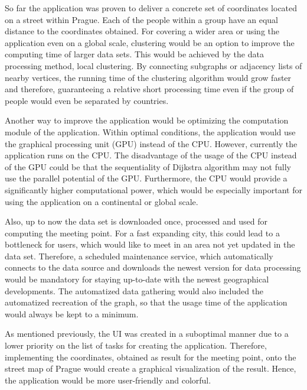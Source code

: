 \documentclass[thesis=M,english]{FITthesis}[2012/10/20]
\begin{document}
So far the application was proven to deliver a concrete set of coordinates located on a street within Prague. Each of the people within a group have an equal distance to the coordinates obtained. 
For covering a wider area or using the application even on a global scale, clustering would be an option to improve the computing time of larger data sets. This would be achieved by the data processing method, local clustering. By connecting subgraphs or adjacency lists of nearby vertices, the running time of the clustering algorithm would grow faster and therefore, guaranteeing a relative short processing time even if the group of people would even be separated by countries.


Another way to improve the application would be optimizing the computation module of the application. Within optimal conditions, the application would use the graphical processing unit (GPU) instead of the CPU. However, currently the application runs on the CPU. The disadvantage of the usage of the CPU instead of the GPU could be that the sequentiality of Dijkstra algorithm may not fully use the parallel potential of the GPU. Furthermore, the CPU would provide a significantly higher computational power, which would be especially important for using the application on a continental or global scale.


Also, up to now the data set is downloaded once, processed and used for computing the meeting point. For a fast expanding city, this could lead to a bottleneck for users, which would like to meet in an area not yet updated in the data set. Therefore, a scheduled maintenance service, which automatically connects to the data source and downloads the newest version for data processing would be mandatory for staying up-to-date with the newest geographical developments. The automatized data gathering would also included the automatized recreation of the graph, so that the usage time of the application would always be kept to a minimum.

As mentioned previously, the UI was created in a suboptimal manner due to a lower priority on the list of tasks for creating the application. Therefore, implementing the coordinates, obtained as result for the meeting point, onto the street map of Prague would create a graphical visualization of the result. Hence, the application would be more user-friendly and colorful.
\end{document}
